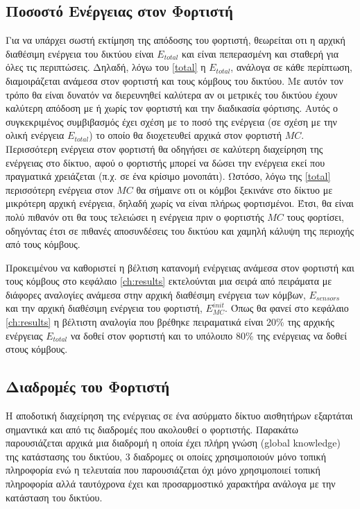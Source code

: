 \subsection{Ποσοστό Ενέργειας στον Φορτιστή}
Για να υπάρχει σωστή εκτίμηση της απόδοσης του φορτιστή, θεωρείται οτι η αρχική διαθέσιμη ενέργεια του δικτύου είναι $E_{total}$ και είναι πεπερασμένη και σταθερή
για όλες τις περιπτώσεις. Δηλαδή, λόγω του \ref{total} η $E_{total}$, ανάλογα σε κάθε περίπτωση, διαμοιράζεται ανάμεσα στον φορτιστή και τους κόμβους του δικτύου. Με
αυτόν τον τρόπο θα είναι δυνατόν να διερευνηθεί καλύτερα αν οι μετρικές του δικτύου έχουν καλύτερη απόδοση με ή χωρίς τον φορτιστή και την διαδικασία φόρτισης. Αυτός
ο συγκεκριμένος συμβιβασμός έχει σχέση με το ποσό της ενέργεια (σε σχέση με την ολική ενέργεια $E_{total}$) το οποίο θα διοχετευθεί αρχικά στον φορτιστή $MC$.
Περισσότερη ενέργεια στον φορτιστή θα οδηγήσει σε καλύτερη διαχείρηση της ενέργειας στο δίκτυο, αφού ο φορτιστής μπορεί να δώσει την ενέργεια εκεί που πραγματικά
χρειάζεται (π.χ. σε ένα κρίσιμο μονοπάτι). Ωστόσο, λόγω της \ref{total} περισσότερη ενέργεια στον $MC$ θα σήμαινε οτι οι κόμβοι ξεκινάνε στο δίκτυο με μικρότερη
αρχική ενέργεια, δηλαδή χωρίς να είναι πλήρως φορτισμένοι. Έτσι, θα είναι πολύ πιθανόν οτι θα τους τελειώσει η ενέργεια πριν ο φορτιστής $MC$ τους φορτίσει,
οδηγόντας έτσι σε πιθανές αποσυνδέσεις του δικτύου και χαμηλή κάλυψη της περιοχής από τους κόμβους.

Προκειμένου να καθοριστεί η βέλτιση κατανομή ενέργειας ανάμεσα στον φορτιστή και τους κόμβους στο κεφάλαιο \ref{ch:results} εκτελούνται μια σειρά από πειράματα με
διάφορες αναλογίες ανάμεσα στην αρχική διαθέσιμη ενέργεια των κόμβων, $E_{sensors}$ και την αρχική διαθέσιμη ενέργεια του φορτιστή, $E^{init}_{MC}$. Όπως θα φανεί στο
κεφάλαιο \ref{ch:results} η βέλτιστη αναλογία που βρέθηκε πειραματικά είναι 20\% της αρχικής ενέργειας $E_{total}$ να δοθεί στον φορτιστή και το υπόλοιπο 80\% της
ενέργειας να δοθεί στους κόμβους.

\subsection{Διαδρομές του Φορτιστή}
Η αποδοτική διαχείρηση της ενέργειας σε ένα ασύρματο δίκτυο αισθητήρων εξαρτάται σημαντικά και από τις διαδρομές που ακολουθεί ο φορτιστής. Παρακάτω παρουσιάζεται
αρχικά μια διαδρομή η οποία έχει πλήρη γνώση (global knowledge) της κατάστασης του δικτύου, 3 διαδρομες οι οποίες χρησιμοποιούν μόνο τοπική πληροφορία ενώ η
τελευταία που παρουσιάζεται όχι μόνο χρησιμοποιεί τοπική πληροφορία αλλά ταυτόχρονα έχει και προσαρμοστικό χαρακτήρα ανάλογα με την κατάσταση του δικτύου.

